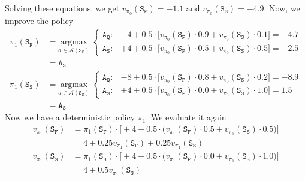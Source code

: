 \documentclass[11pt]{article}
\begin{document}
    Solving these equations, we get $v_{\pi_{0}}(\texttt{S}_{\texttt{F}}) = -1.1$ and $v_{\pi_{0}}(\texttt{S}_{\texttt{S}}) = -4.9$. Now, we improve the policy
    \begin{align*}
        \pi_{1}(\texttt{S}_{\texttt{F}}) &= \underset{a \in \mathcal{A}(\texttt{S}_{\texttt{F}})}{\mathrm{argmax}} \
        \begin{cases}
            \texttt{A}_{\texttt{Q}}: & -4 + 0.5 \cdot \big[ v_{\pi_{0}}(\texttt{S}_{\texttt{F}}) \cdot 0.9 + v_{\pi_{0}}(\texttt{S}_{\texttt{S}}) \cdot 0.1 \big] = -4.7 \\
            \texttt{A}_{\texttt{S}}: & +4 + 0.5 \cdot \big[ v_{\pi_{0}}(\texttt{S}_{\texttt{F}}) \cdot 0.5 + v_{\pi_{0}}(\texttt{S}_{\texttt{S}}) \cdot 0.5 \big] = -2.5
        \end{cases} \\
        &= \texttt{A}_{\texttt{S}} \\
        \pi_{1}(\texttt{S}_{\texttt{S}}) &= \underset{a \in \mathcal{A}(\texttt{S}_{\texttt{S}})}{\mathrm{argmax}} \
        \begin{cases}
            \texttt{A}_{\texttt{Q}}: & -8 + 0.5 \cdot \big[ v_{\pi_{0}}(\texttt{S}_{\texttt{F}}) \cdot 0.8 + v_{\pi_{0}}(\texttt{S}_{\texttt{S}}) \cdot 0.2 \big] = -8.9 \\
            \texttt{A}_{\texttt{S}}: & +4 + 0.5 \cdot \big[ v_{\pi_{0}}(\texttt{S}_{\texttt{F}}) \cdot 0.0 + v_{\pi_{0}}(\texttt{S}_{\texttt{S}}) \cdot 1.0 \big] = 1.5
        \end{cases} \\
        &= \texttt{A}_{\texttt{S}}
    \end{align*}
    Now we have a deterministic policy $\pi_{1}$. We evaluate it again
    \begin{align*}
        v_{\pi_{1}}(\texttt{S}_{\texttt{F}}) &= \pi_{1}(\texttt{S}_{\texttt{F}}) \cdot \big[ +4 + 0.5 \cdot \big( v_{\pi_{1}}(\texttt{S}_{\texttt{F}}) \cdot 0.5 + v_{\pi_{1}}(\texttt{S}_{\texttt{S}}) \cdot 0.5 \big) \big] \\
        &= 4 + 0.25 v_{\pi_{1}}(\texttt{S}_{\texttt{F}}) + 0.25 v_{\pi_{1}}(\texttt{S}_{\texttt{S}}) \\
        v_{\pi_{1}}(\texttt{S}_{\texttt{S}}) &= \pi_{1}(\texttt{S}_{\texttt{S}}) \cdot \big[ +4 + 0.5 \cdot \big( v_{\pi_{1}}(\texttt{S}_{\texttt{F}}) \cdot 0.0 + v_{\pi_{1}}(\texttt{S}_{\texttt{S}}) \cdot 1.0 \big) \big] \\
        &= 4 + 0.5 v_{\pi_{1}}(\texttt{S}_{\texttt{S}})
    \end{align*}
\end{document}

